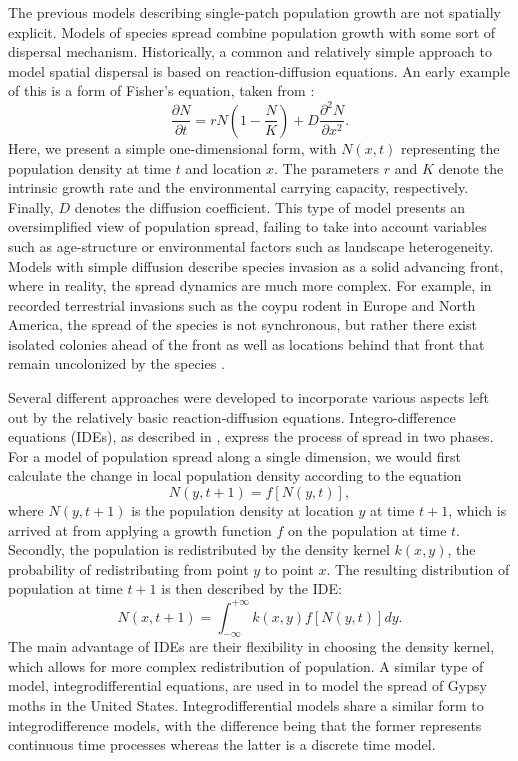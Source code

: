 \documentclass[12pt, openany]{book}
\theoremstyle{definition}
\theoremstyle{remark}
\numberwithin{equation}{chapter}
\numberwithin{figure}{chapter}
\begin{document}
The previous models describing single-patch population growth are not spatially explicit. Models of species spread combine population growth with some sort of dispersal mechanism. Historically, a common and relatively simple approach to model spatial dispersal is based on reaction-diffusion equations. An early example of this is a form of Fisher's equation, taken from \cite{neubert2004projecting}:
\begin{equation}\label{fisher}
\frac{\partial{N}}{\partial{t}} = rN\left(1-\frac{N}{K}\right) + D\frac{\partial^2{N}}{\partial{x^2}}.
\end{equation}
Here, we present a simple one-dimensional form, with $N(x,t)$ representing the population density at time $t$ and location $x$. The parameters $r$ and $K$ denote the intrinsic growth rate and the environmental carrying capacity, respectively. Finally, $D$ denotes the diffusion coefficient. This type of model presents an oversimplified view of population spread, failing to take into account variables such as age-structure or environmental factors such as landscape heterogeneity. Models with simple diffusion describe species invasion as a solid advancing front, where in reality, the spread dynamics are much more complex. For example, in recorded terrestrial invasions such as the coypu rodent in Europe and North America, the spread of the species is not synchronous, but rather there exist isolated colonies ahead of the front as well as locations behind that front that remain uncolonized by the species \citep{reeves1989application}.

Several different approaches were developed to incorporate various aspects left out by the relatively basic reaction-diffusion equations. Integro-difference equations (IDEs), as described in \cite{neubert2004projecting}, express the process of spread in two phases. For a model of population spread along a single dimension, we would first calculate the change in local population density according to the equation
\begin{equation}\label{ide1}
N(y, t+1) = f[N(y,t)],
\end{equation}
where $N(y, t+1)$ is the population density at location $y$ at time $t+1$, which is arrived at from applying a growth function $f$ on the population at time $t$. Secondly, the population is redistributed by the density kernel $k(x,y)$, the probability of redistributing from point $y$ to point $x$. The resulting distribution of population at time $t+1$ is then described by the IDE:
\begin{equation}\label{ide2}
N(x, t+1) = \int^{+\infty}_{-\infty} k(x,y)f[N(y,t)]dy.
\end{equation}
The main advantage of IDEs are their flexibility in choosing the density kernel, which allows for more complex redistribution of population. A similar type of model, integrodifferential equations, are used in \cite{sharov1998model} to model the spread of Gypsy moths in the United States. Integrodifferential models share a similar form to integrodifference models, with the difference being that the former represents continuous time processes whereas the latter is a discrete time model.
\end{document}
